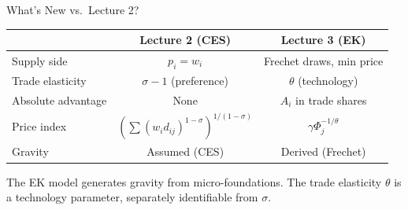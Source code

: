 \documentclass{beamer}
\begin{document}
\begin{frame}{What's New vs.\ Lecture 2?}

    \begin{center}
    {\footnotesize
    \begin{tabular}{lcc}
        \toprule
        & \textbf{Lecture 2 (CES)} & \textbf{Lecture 3 (EK)} \\
        \midrule
        Supply side & $p_i = w_i$ & Frechet draws, min price \\
        Trade elasticity & $\sigma - 1$ (preference) & $\theta$ (technology) \\
        Absolute advantage & None & $A_i$ in trade shares \\
        Price index & $(\sum (w_i d_{ij})^{1-\sigma})^{1/(1-\sigma)}$ & $\gamma \Phi_j^{-1/\theta}$ \\
        Gravity & Assumed (CES) & Derived (Frechet) \\
        \bottomrule
    \end{tabular}
    }
    \end{center}

    \vspace{0.3em}
     The EK model generates gravity from micro-foundations. The trade elasticity $\theta$ is a technology parameter, separately identifiable from $\sigma$.

\end{frame}
\end{document}
